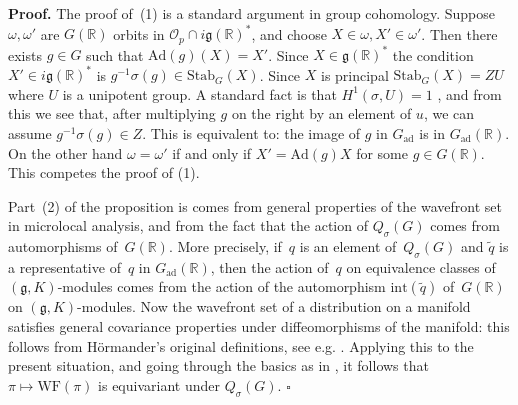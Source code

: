 \documentclass[10pt,leqno]{article}
\numberwithin{equation}{section}
\newcommand{\qed}{\hfill $\square$ \medskip}
\newenvironment{proof}[1][Proof]{\noindent\textbf{#1.} }{\qed}
\newcommand{\Ad}{\mathrm{Ad}}
\newcommand{\Gad}{G_\mathrm{ad}}
\newcommand{\Stab}{\mathrm{Stab}}
\renewcommand{\O}{\mathcal O}
\newcommand{\R}{\mathbb R}
\newcommand{\g}{\mathfrak g}
\newcommand\inv{^{-1}}
\newcommand{\WF}{\mathrm{WF}}
\newcommand{\Op}{\O_p}
\begin{document}
\begin{proof}
The proof of~(1) is a standard argument in group cohomology. Suppose $\omega,\omega'$ are $G(\R)$ orbits in $\Op\cap i\g(\R)^*$,
and choose $X\in \omega,X'\in\omega'$. Then there exists $g\in G$ such that $\Ad(g)(X)=X'$. Since $X\in \g(\R)^*$ the condition $X'\in i\g(\R)^*$ 
is $g\inv \sigma(g)\in \Stab_G(X)$.  Since $X$ is principal $\Stab_G(X)=ZU$ where $U$ is a unipotent group. 
A standard fact is that $H^1(\sigma, U)=1$ \cite[Chap.~III, Proposition~6]{Serre_Galois}, and from this we see that, after multiplying $g$ on the right by an element of $u$, we can assume $g\inv \sigma(g)\in Z$. This is equivalent to: the image of $g$ in $\Gad$ is in $\Gad(\R)$. On the other hand $\omega=\omega'$ 
if and only if $X'=\Ad(g)X$ for some $g\in G(\R)$. This competes the proof of (1).

Part~(2) of the proposition is comes from general properties of the wavefront set in microlocal analysis, and from the fact that the action of $Q_{\sigma}(G)$ comes from automorphisms of~$G(\R)$. More precisely, if~$q$ is an element of~$Q_{\sigma}(G)$ and $\tilde{q}$ is a representative of~$q$ in $\Gad(\R)$, then the action of~$q$ on equivalence classes of $(\g, K)$-modules comes from the action of the automorphism $\mathrm{int}(\tilde{q})$ of~$G(\R)$ on $(\g, K)$-modules. Now the wavefront set of a distribution on a manifold satisfies general covariance properties under diffeomorphisms of the manifold: this follows from Hörmander's original definitions, see e.g. \cite[Section 2, p.~800]{HarrisHeOlafsson}. Applying this to the present situation, and going through the basics as in   \cite[Section~2]{HarrisHeOlafsson}, it follows that $\pi \mapsto \WF(\pi)$ is equivariant under $Q_{\sigma}(G)$.
\end{proof}
\end{document}
